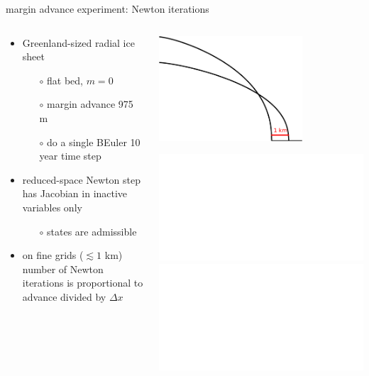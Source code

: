 \documentclass[hide notes,intlimits,usenames,dvipsnames]{beamer}
\begin{document}
\begin{frame}{margin advance experiment: Newton iterations}

\begin{columns}
\begin{column}{0.45\textwidth}
\begin{itemize}
\item Greenland-sized radial ice sheet
    \begin{itemize}
    \item[$\circ$] flat bed, $m=0$
    \item[$\circ$] margin advance 975 m
    \item[$\circ$] do a single BEuler 10 year time step
    \end{itemize}
\item reduced-space Newton step has Jacobian in inactive variables only
    \begin{itemize}
    \item[$\circ$] states are admissible
    \end{itemize}
\item<2> on fine grids ($\lesssim 1$ km) number of Newton iterations is proportional to advance divided by $\Delta x$
\end{itemize}\end{column}
\begin{column}{0.55\textwidth}

\bigskip
\hfill \includegraphics[width=0.7\textwidth]{halfarcartoon.pdf}

\bigskip
\includegraphics<1>[width=\textwidth]{newtoniters.pdf}
\includegraphics<2>[width=\textwidth]{newtonitersFIT.pdf}
\end{column}
\end{columns}
\end{frame}
\end{document}
